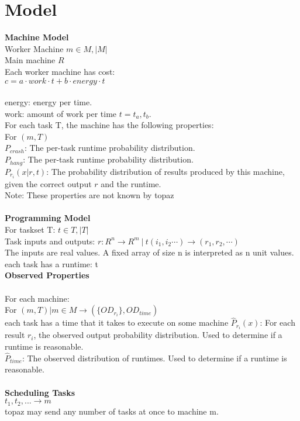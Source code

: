 \documentclass[11pt, oneside]{article}   	%
\begin{document}
\section {Model}
\textbf {Machine Model}\\
Worker Machine $m \in M, |M|$\\
Main machine $R$\\
Each worker machine has cost: \\
$c = a \cdot work \cdot t + b \cdot energy \cdot t$\\\\
energy: energy per time.\\
work: amount of work per time $t={t_a, t_b}$.\\
For each task T, the machine has the following properties:\\
For $(m, T)$\\
$P_{crash}$: The per-task runtime probability distribution.\\
$P_{hang}$: The per-task runtime probability distribution.\\
$P_{r_i}(x|r,t)$: The probability distribution of results produced by this machine, given the correct output $r$ and the runtime.\\ 
Note: These properties are not known by topaz\\
\\
\textbf {Programming Model}\\
For taskset T: $t \in T, |T|$\\
Task inputs and outputs: $r:R^n \rightarrow R^m ~|~ t(i_1, i_2 \cdots) \rightarrow (r_1, r_2, \cdots)$\\
The inputs are real values. A fixed array of size n is interpreted as n unit values.\\
each task has a runtime: t\\

\textbf{Observed Properties}\\\\
For each machine:\\
For $(m, T) | m \in M \rightarrow (\{OD_{r_i}\}, OD_{time})$
\\
each task has a time that it takes to execute on some machine
$\hat P_{r_i}(x)$: For each result $r_i$, the observed output probability distribution. Used to determine if a runtime is reasonable.\\
$\hat P_{time}$: The observed distribution of runtimes. Used to determine if a runtime is reasonable.\\\\
\textbf {Scheduling Tasks}\\
${t_1, t_2, ...} \rightarrow m$\\
topaz may send any number of tasks at once to machine m.
\end{document}
